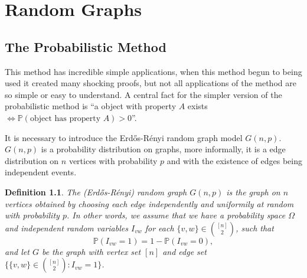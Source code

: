\documentclass[12pt,twoside,a4paper,bibliography=totocnumbered]{book}
\numberwithin{equation}{section}
\newtheorem{theorem}             {Theorem}[section]
\newtheorem{definition}	[theorem] {Definition}
\theoremstyle{remark}
\begin{document}







\chapter{Random Graphs}
\section{The Probabilistic Method}
This method has incredible simple applications, when this method begun to being used it created many shocking proofs, but not all applications of the method are so simple or easy to understand. A central fact for the simpler version of the probabilistic method is ``a object with property $ A$ exists $\iff  \mathbb{P}(\text{object has property }A)>0$''.

It is necessary to introduce the Erd\H{o}s-Rényi random graph model $G(n,p)$. $G(n,p)$ is a probability distribution on graphs, more informally, it is a edge distribution on $n$ vertices with probability $p$ and with the existence of edges being independent events.

\begin{definition}\label{def:randomgraph}
The (Erd\H{o}s-Rényi) random graph $G(n,p)$ is the graph on $n$ vertices obtained by choosing each edge independently and uniformily at random with probability $p$. In other words, we assume that we have a probability space $\Omega$ and independent random variables $I_{vw}$ for each $\{v,w\} \in \binom{[n]}{2}$, such that
$$\mathbb{P}(I_{vw} = 1) = 1 - \mathbb{P}(I_{vw} = 0),$$ 
and let $G$ be the graph with vertex set $[n]$ and edge set $\{\{v,w\} \in \binom{[n]}{2}: I_{vw} = 1\}$. 

\end{definition}
\end{document}
